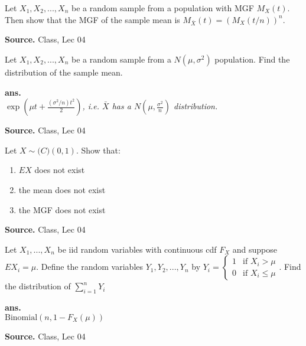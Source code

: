 \documentclass[12pt,twoside]{report}
\newenvironment*{ans}{\textbf{ans.}\space\em\\}{\par}
\newenvironment*{source}{\hfill\scriptsize\textbf{Source.}\space}{\par}
\begin{document}
\begin{samepage}
\begin{ex}
    Let $X_1, X_2, ..., X_n$ be a random sample from a population with MGF $M_X(t)$. Then show that the MGF of the sample mean is $M_{\bar{X}} (t) = (M_X (t/n))^n$.
\end{ex}
\begin{source}
Class, Lec 04
\end{source}
\end{samepage}
\begin{samepage}
    \begin{ex}
        Let $X_1, X_2, ..., X_n$ be a random sample from a $N(\mu, \sigma^2)$ population. Find the distribution of the sample mean.
    \end{ex}
    \begin{ans}
        $\exp({\mu t + \frac{(\sigma^2 / n)t^2}{2}})$, i.e. $\bar{X}$ has a $N(\mu, \frac{\sigma^2}{n})$ distribution.
    \end{ans}
    \begin{source}
        Class, Lec 04
    \end{source}
\end{samepage}

\begin{samepage}
\begin{ex}
Let $X \sim \mathcal(C)(0,1)$. Show that:
    \begin{enumerate}
        \item $EX$ does not exist 
        \item the mean does not exist
        \item the MGF does not exist
    \end{enumerate}
\end{ex}
\begin{source}
Class, Lec 04
\end{source}
\end{samepage}

\begin{samepage}
\begin{ex}
Let $X_1, ..., X_n$ be iid random variables with continuous cdf $F_X$ and suppose $EX_i = \mu$. Define the random variables $Y_1, Y_2, ..., Y_n$ by $Y_i = \begin{cases} 1 & \text{if } X_i > \mu \\ 0 & \text{if } X_i \leq \mu \end{cases}$.
Find the distribution of $\sum_{i=1}^n Y_i$
\end{ex}
\begin{ans}
$\text{Binomial}(n,1-F_X (\mu))$
\end{ans}
\begin{source}
Class, Lec 04
\end{source}
\end{samepage}
\end{document}
